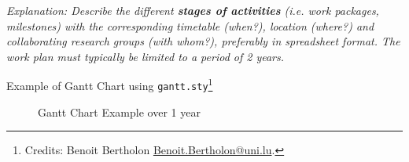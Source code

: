 % 
% 

\emph{Explanation: Describe the different \textbf{stages of activities} (i.e. work
  packages, milestones) with the corresponding timetable (when?), location
  (where?) and collaborating research groups (with whom?), preferably in
  spreadsheet format.
  The work plan must typically be limited to a period of 2 years.
}



Example of Gantt Chart using \texttt{gantt.sty}\footnote{Credits: Benoit
  Bertholon \url{Benoit.Bertholon@uni.lu}.}

\begin{figure}[H]
    \hspace{-5em}
    \begin{gantt}{7}{12}
        \begin{ganttitle}
        \end{ganttitle}

    \end{gantt}
    \caption{Gantt Chart Example over 1 year}
    \label{fig:timeline}

\end{figure}



% 
